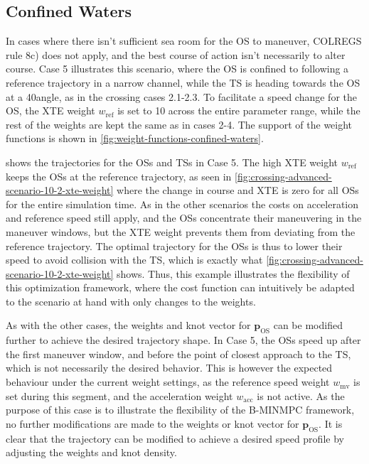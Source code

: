 \subsection{Confined Waters}\label{sec:confined-waters}
In cases where there isn't sufficient sea room for the OS to maneuver, COLREGS rule 8c) does not apply, and the best course of action isn't necessarily to alter course. Case 5 illustrates this scenario, where the OS is confined to following a reference trajectory in a narrow channel, while the TS is heading towards the OS at a 40\degree angle, as in the crossing cases 2.1-2.3. To facilitate a speed change for the OS, the XTE weight $w_\text{ref}$ is set to 10 across the entire parameter range, while the rest of the weights are kept the same as in cases 2-4. The support of the weight functions is shown in \cref{fig:weight-functions-confined-waters}. 

 shows the trajectories for the OSs and TSs in Case 5. The high XTE weight $w_\text{ref}$ keeps the OSs at the reference trajectory, as seen in \cref{fig:crossing-advanced-scenario-10-2-xte-weight} where the change in course and XTE is zero for all OSs for the entire simulation time. As in the other scenarios the costs on acceleration and reference speed still apply, and the OSs concentrate their maneuvering in the maneuver windows, but the XTE weight prevents them from deviating from the reference trajectory. The optimal trajectory for the OSs is thus to lower their speed to avoid collision with the TS, which is exactly what \cref{fig:crossing-advanced-scenario-10-2-xte-weight} shows. 
Thus, this example illustrates the flexibility of this optimization framework, where the cost function can intuitively be adapted to the scenario at hand with only changes to the weights. 

As with the other cases, the weights and knot vector for $\mathbf p_\text{OS}$ can be modified further to achieve the desired trajectory shape. In Case 5, the OSs speed up after the first maneuver window, and before the point of closest approach to the TS, which is not necessarily the desired behavior. This is however the expected behaviour under the current weight settings, as the reference speed weight $w_\text{mv}$ is set during this segment, and the acceleration weight $w_\text{acc}$ is not active. As the purpose of this case is to illustrate the flexibility of the B-MINMPC framework, no further modifications are made to the weights or knot vector for $\mathbf p_\text{OS}$. It is clear that the trajectory can be modified to achieve a desired speed profile by adjusting the weights and knot density.


